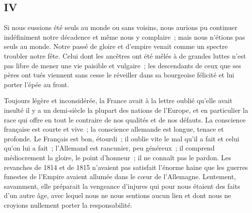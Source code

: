 \documentclass[french,twoside]{book} %
\begin{document}
\subsection[{IV}]{IV}
\noindent Si nous eussions été seuls au monde ou sans voisins, nous aurions pu continuer indéfiniment notre décadence et même nous y complaire ; mais nous n’étions pas seuls au monde. Notre passé de gloire et d’empire venait comme un spectre troubler notre fête. Celui dont les ancêtres ont été mêlés à de grandes luttes n’est pas libre de mener une vie paisible et vulgaire ; les descendants de ceux que ses pères ont tués viennent sans cesse le réveiller dans sa bourgeoise félicité et lui porter l’épée au front.\par
Toujours légère et inconsidérée, la France avait à la lettre oublié qu’elle avait insulté il y a un demi-siècle la plupart des nations de l’Europe, et en particulier la race qui offre en tout le contraire de nos qualités et de nos défauts. La conscience française est courte et vive ; la conscience allemande est longue, tenace et profonde. Le Français est bon, étourdi ; il oublie vite le mal qu’il a fait et celui qu’on lui a fait ; l’Allemand est rancunier, peu généreux ; il comprend médiocrement la gloire, le point d’honneur ; il ne connaît pas le pardon. Les revanches de 1814 et de 1815 n’avaient pas satisfait l’énorme haine que les guerres funestes de l’Empire avaient allumée dans le cœur de l’Allemagne. Lentement, savamment, elle préparait la vengeance d’injures qui pour nous étaient des faits d’un autre âge, avec lequel nous ne nous sentions aucun lien et dont nous ne croyions nullement porter la responsabilité.\par
\end{document}
